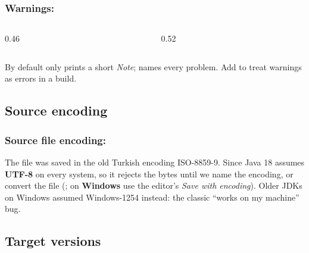 \documentclass[aspectratio=169,10pt,compress]{beamer}
\newcommand{\win}{\textbf{Windows}}
\begin{document}
\begin{frame}[t,fragile] \frametitle{Warnings: }
  \begin{columns}[T]
    \begin{column}{0.46\textwidth}
    \end{column}
    \begin{column}{0.52\textwidth}
    \end{column}
  \end{columns}

  \vspace{0.1em}
  \small By default  only prints a short \emph{Note};  names every problem.
  Add  to treat warnings as errors in a build.
\end{frame}

\subsection[Encoding]{Source encoding}




\begin{frame}[t,fragile] \frametitle{Source file encoding: }

  \vspace{0.1em}
  \small
  The file was saved in the old Turkish encoding ISO-8859-9. Since Java 18  assumes \textbf{UTF-8} on every system, so
  it rejects the bytes until we name the encoding, or convert the file (; on \win{} use the editor's \emph{Save with encoding}). Older JDKs on Windows assumed Windows-1254 instead: the classic
  ``works on my machine'' bug.   
\end{frame}

\subsection[Release]{Target versions}
\end{document}
